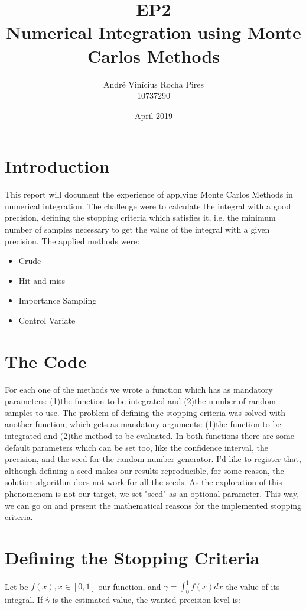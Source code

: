 \documentclass{article}
\title{\Large EP2 \\ Numerical Integration using Monte Carlos Methods}
\author{André Vinícius Rocha Pires \\ 10737290}
\date{April 2019}
\begin{document}
\maketitle

\section{Introduction}
This report will document the experience of applying Monte Carlos Methods in numerical integration. The challenge were to calculate the integral with a good precision, defining the stopping criteria which satisfies it, i.e. the minimum number of samples necessary to get the value of the integral with a given precision. The applied methods were:

\begin{itemize}
    \item Crude
    \item Hit-and-miss
    \item Importance Sampling
    \item Control Variate
\end{itemize}

\section{The Code}
For each one of the methods we wrote a function which has as mandatory parameters: (1)the function to be integrated and (2)the number of random samples to use. The problem of defining the stopping criteria was solved with another function, which gets as mandatory arguments: (1)the function to be integrated and (2)the method to be evaluated. In both functions there are some default parameters which can be set too, like the confidence interval, the precision, and the seed for the random number generator. I'd like to register that, although defining a seed makes our results reproducible, for some reason, the solution algorithm does not work for all the seeds. As the exploration of this phenomenom is not our target, we set "seed" as an optional parameter. This way, we can go on and present the mathematical reasons for the implemented stopping criteria.

\section{Defining the Stopping Criteria}
Let be $f(x), x \in [0,1]$ our function, and $\gamma = \int_{0}^{1}f(x)dx$ the value of its integral. If $\hat{\gamma}$ is the estimated value, the wanted precision level is:
\end{document}
